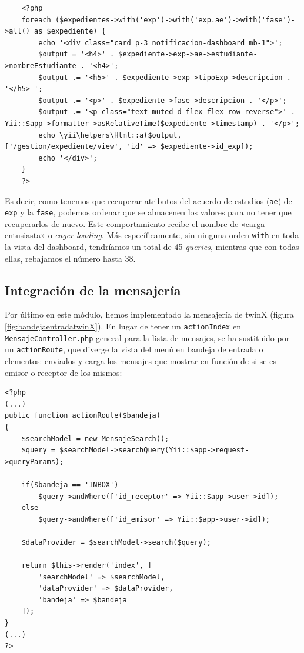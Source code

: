 \begin{verbatim}
	<?php
	foreach ($expedientes->with('exp')->with('exp.ae')->with('fase')->all() as $expediente) {
		echo '<div class="card p-3 notificacion-dashboard mb-1">';
		$output = '<h4>' . $expediente->exp->ae->estudiante->nombreEstudiante . '<h4>';
		$output .= '<h5>' . $expediente->exp->tipoExp->descripcion . '</h5> ';
		$output .= '<p>' . $expediente->fase->descripcion . '</p>';
		$output .= '<p class="text-muted d-flex flex-row-reverse">' . Yii::$app->formatter->asRelativeTime($expediente->timestamp) . '</p>';
		echo \yii\helpers\Html::a($output, ['/gestion/expediente/view', 'id' => $expediente->id_exp]);
		echo '</div>';
	}
	?>
\end{verbatim}

Es decir, como tenemos que recuperar atributos del acuerdo de estudios (\texttt{ae}) de \texttt{exp} y la \texttt{fase}, podemos ordenar que se almacenen los valores para no tener que recuperarlos de nuevo. Este comportamiento recibe el nombre de «carga entusiasta» o \textit{eager loading}. Más específicamente, sin ninguna orden \texttt{with} en toda la vista del dashboard, tendríamos un total de 45 \textit{queries}, mientras que con todas ellas, rebajamos el número hasta 38.

\subsection{Integración de la mensajería}

Por último en este módulo, hemos implementado la mensajería de twinX (figura \ref{fig:bandejaentradatwinX}). En lugar de tener un \texttt{actionIndex} en \texttt{MensajeController.php} general para la lista de mensajes, se ha sustituido por un \texttt{actionRoute}, que diverge la vista del menú en bandeja de entrada o elementos: enviados y carga los mensajes que mostrar en función de si se es emisor o receptor de los mismos:

\begin{verbatim}
<?php
(...)
public function actionRoute($bandeja)
{
	$searchModel = new MensajeSearch();
	$query = $searchModel->searchQuery(Yii::$app->request->queryParams);
	
	if($bandeja == 'INBOX')
		$query->andWhere(['id_receptor' => Yii::$app->user->id]);
	else
		$query->andWhere(['id_emisor' => Yii::$app->user->id]);
	
	$dataProvider = $searchModel->search($query);
	
	return $this->render('index', [
		'searchModel' => $searchModel,
		'dataProvider' => $dataProvider,
		'bandeja' => $bandeja
	]);
}
(...)
?>
\end{verbatim}


